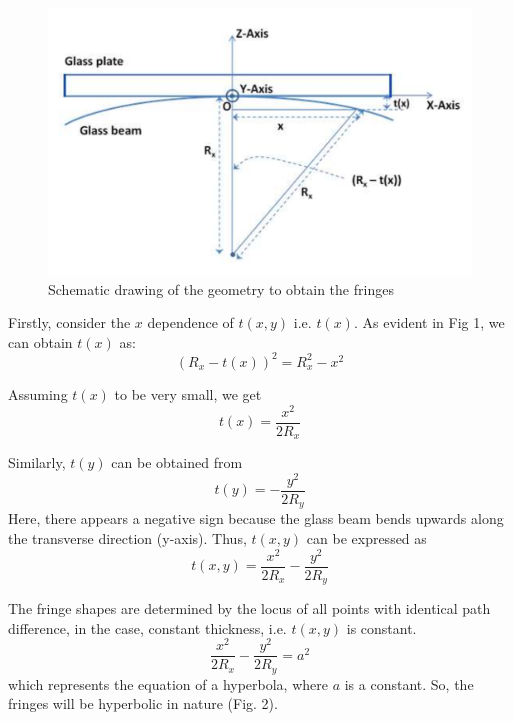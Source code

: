\begin{figure}[H]
    \centering
    \label{fig:1}
    \includegraphics[width=1\columnwidth]{images/f1.png}
    \caption{Schematic drawing of the geometry to obtain the fringes}
\end{figure}

Firstly, consider the $x$ dependence of $t(x,y)$ i.e. $t(x)$. As evident in Fig 1, we can obtain $t(x)$ as:
\begin{equation}
    (R_x - t(x))^2 = R_x^2 - x^2
\end{equation}

Assuming $t(x)$ to be very small, we get
\begin{equation}
    t(x) = \frac{x^2}{2R_x}
\end{equation}

Similarly, $t(y)$ can be obtained from
\begin{equation}
    t(y) = -\frac{y^2}{2R_y}
\end{equation}
Here, there appears a negative sign because the glass beam bends upwards along the transverse direction (y-axis). Thus, $t(x, y)$ can be expressed as
\begin{equation}
    t(x, y)=\frac{x^2}{2R_x}-\frac{y^2}{2R_y}
\end{equation}

The fringe shapes are determined by the locus of all points with identical path difference, in the case, constant thickness, i.e. $t(x,y)$ is constant.
\begin{equation}
    \frac{x^2}{2R_x}-\frac{y^2}{2R_y} = a^2
\end{equation}
which represents the equation of a hyperbola, where $a$ is a constant. So, the fringes will be hyperbolic in nature (Fig. 2).

